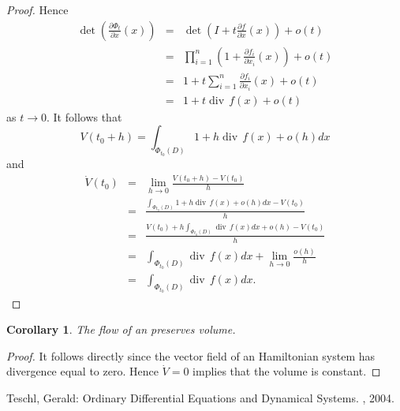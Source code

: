 \documentclass[12pt]{article}
\newtheorem{cor}{Corollary}
\begin{document}
\begin{proof}
Hence
\begin{eqnarray*}
\operatorname{det}\left(\frac{\partial\Phi_t}{\partial x}(x)\right) & = & \operatorname{det}\left(I + t\frac{\partial f}{\partial x}(x)\right) + o(t)\\
& = & \prod_{i=1}^n(1 + \frac{\partial f_i}{\partial x_i}(x)) + o(t)\\
& = & 1+t\sum_{i=1}^n\frac{\partial f_i}{\partial x_i}(x) +o(t)\\
& = & 1 + t\operatorname{div}\, f(x) + o(t)
\end{eqnarray*}
as $t\to0$.
It follows that 
$$V(t_0+h) = \int_{\Phi_{t_0}(D)} 1 + h\operatorname{div}\, f(x) + o(h) dx$$
and
\begin{eqnarray*}
\dot{V}(t_0) & = & \lim_{h\to 0}\frac{V(t_0+h)-V(t_0)}{h}\\
& = & \frac{\int_{\Phi_{t_0}(D)} 1 + h\operatorname{div}\, f(x) + o(h) dx -V(t_0)}{h}\\
& = & \frac{V(t_0) + h\int_{\Phi_{t_0}(D)}\operatorname{div}\, f(x)dx + o(h) -V(t_0)}{h}\\
& = & \int_{\Phi_{t_0}(D)}\operatorname{div}\, f(x)dx + \lim_{h\to 0}\frac{o(h)}{h}\\
& = & \int_{\Phi_{t_0}(D)}\operatorname{div}\, f(x)dx.
\end{eqnarray*}
\end{proof}

\begin{cor}
The flow of an  preserves volume.
\end{cor}
\begin{proof}
It follows directly since the vector field of an Hamiltonian system has divergence equal to zero.  Hence $\dot{V}=0$ implies that the volume is constant.
\end{proof}

\begin{thebibliography}{1}
 Teschl, Gerald: Ordinary Differential Equations and Dynamical Systems. , 2004.
\end{thebibliography}
\end{document}
